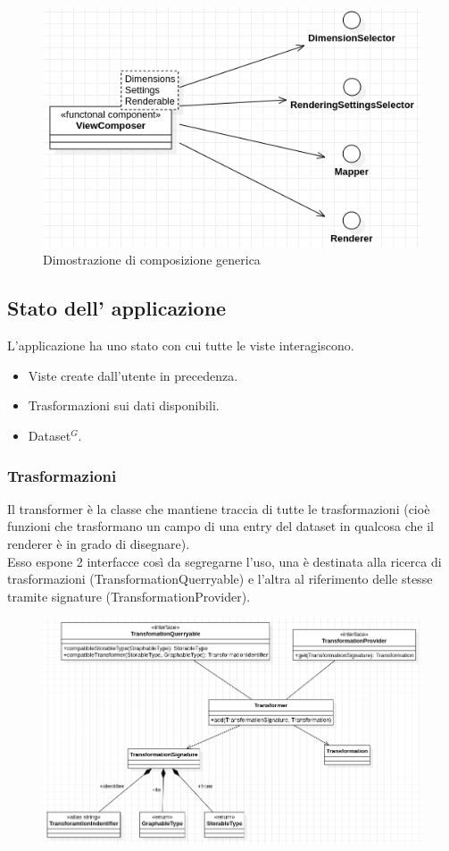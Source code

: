 \begin{figure}[h!]
  \centering
  \includegraphics[scale=0.55]{../../assets/classi_uml/comdelcomposer.png}
  \caption{Dimostrazione di composizione generica}
\end{figure}
\newpage

\subsection{Stato dell' applicazione}
L'applicazione ha uno stato con cui tutte le viste interagiscono.
\begin{itemize}
  \item Viste create dall'utente in precedenza.
  \item Trasformazioni sui dati disponibili.
  \item Dataset$^{G}$.
\end{itemize}

\subsubsection{Trasformazioni}
Il transformer è la classe che mantiene traccia di tutte le trasformazioni (cioè
funzioni che trasformano un campo di una entry del dataset in qualcosa che il
renderer è in grado di disegnare). \\
Esso espone 2 interfacce così da segregarne l'uso, una è destinata alla ricerca di
trasformazioni (TransformationQuerryable) e l'altra al riferimento delle stesse tramite
signature (TransformationProvider).
\begin{figure}[h!]
  \centering
  \includegraphics[scale=0.65]{../../assets/classi_uml/modeltransfomer.png}
\end{figure}

